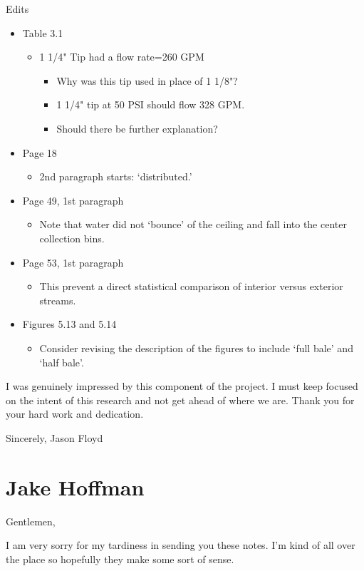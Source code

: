 \documentclass[12pt,oneside]{book}
\begin{document}
\begin{appendix}
Edits
\begin{itemize}
\item Table 3.1
	\begin{itemize}
	\item 1 1/4" Tip had a flow rate=260 GPM
		\begin{itemize}
			\item Why was this tip used in place of 1 1/8"?
			\item 1 1/4" tip at 50 PSI should flow 328 GPM.
			\item Should there be further explanation?
		\end{itemize}
	\end{itemize}
\item  Page 18
	\begin{itemize}
		\item 2nd paragraph starts: `distributed.'
	\end{itemize}
\item Page 49, 1st paragraph
	\begin{itemize}
		\item Note that water did not `bounce' of the ceiling and fall into the center collection bins.
	\end{itemize}
\item Page 53, 1st paragraph
	\begin{itemize}
		\item This prevent a direct statistical comparison of interior versus exterior streams.
	\end{itemize}
\item Figures 5.13 and 5.14
	\begin{itemize}
		\item Consider revising the description of the figures to include `full bale' and `half bale'.
	\end{itemize}
\end{itemize}
 
I was genuinely impressed by this component of the project. I must keep focused on the intent of this research and not get ahead of where we are. Thank you for your hard work and dedication.
 
Sincerely,
Jason Floyd

\section{Jake Hoffman}

Gentlemen,

I am very sorry for my tardiness in sending you these notes.  I'm kind of all over the place so hopefully they make some sort of sense. 


\end{appendix}
\end{document}

